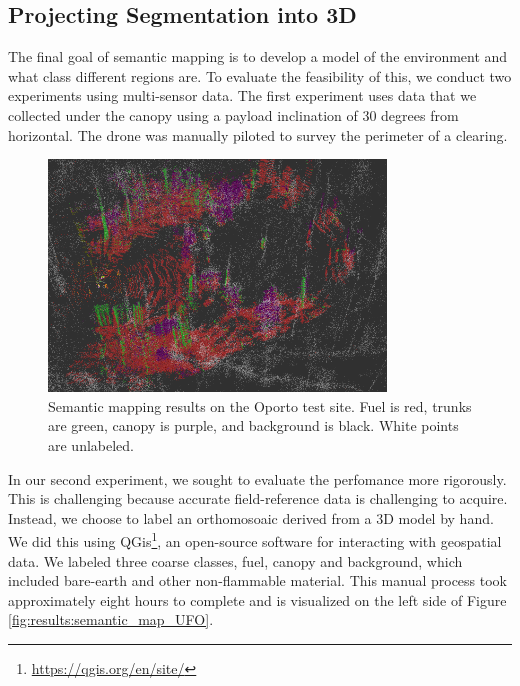 \subsection{Projecting Segmentation into 3D}
The final goal of semantic mapping is to develop a model of the environment and what class different regions are. To evaluate the feasibility of this, we conduct two experiments using multi-sensor data.
The first experiment uses data that we collected under the canopy using a payload inclination of 30 degrees from horizontal. The drone was manually piloted to survey the perimeter of a clearing.  

\begin{figure}
    \centering
    \includegraphics[width=0.8\textwidth]{figs/results/semantic_mapping/semantic_cloud_first_approach.png}
    \caption{Semantic mapping results on the Oporto test site. Fuel is red, trunks are green, canopy is purple, and background is black. White points are unlabeled.}
    \label{fig:semantic_SLAM_result}
\end{figure}

In our second experiment, we sought to evaluate the perfomance more rigorously. This is challenging because accurate field-reference data is challenging to acquire. Instead, we choose to label an orthomosoaic derived from a 3D model by hand. We did this using QGis\footnote{\url{https://qgis.org/en/site/}}, an open-source software for interacting with geospatial data. We labeled three coarse classes, fuel, canopy and background, which included bare-earth and other non-flammable material. This manual process took approximately eight hours to complete and is visualized on the left side of Figure \ref{fig:results:semantic_map_UFO}.


